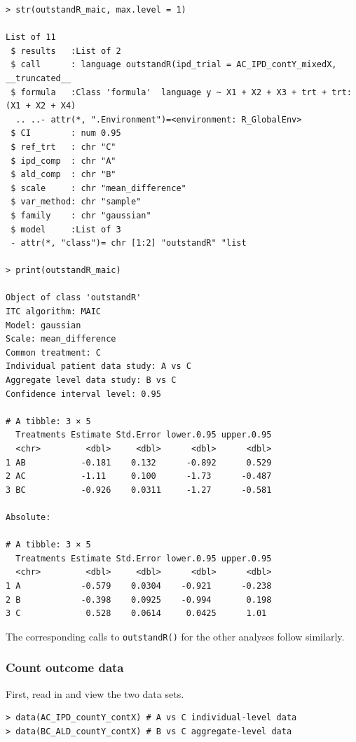 \documentclass[article]{jss}
\begin{document}
\begin{verbatim}
> str(outstandR_maic, max.level = 1)

List of 11
 $ results   :List of 2
 $ call      : language outstandR(ipd_trial = AC_IPD_contY_mixedX, __truncated__
 $ formula   :Class 'formula'  language y ~ X1 + X2 + X3 + trt + trt:(X1 + X2 + X4)
  .. ..- attr(*, ".Environment")=<environment: R_GlobalEnv> 
 $ CI        : num 0.95
 $ ref_trt   : chr "C"
 $ ipd_comp  : chr "A"
 $ ald_comp  : chr "B"
 $ scale     : chr "mean_difference"
 $ var_method: chr "sample"
 $ family    : chr "gaussian"
 $ model     :List of 3
 - attr(*, "class")= chr [1:2] "outstandR" "list

> print(outstandR_maic)

Object of class 'outstandR' 
ITC algorithm: MAIC 
Model: gaussian 
Scale: mean_difference 
Common treatment: C 
Individual patient data study: A vs C 
Aggregate level data study: B vs C 
Confidence interval level: 0.95 

# A tibble: 3 × 5
  Treatments Estimate Std.Error lower.0.95 upper.0.95
  <chr>         <dbl>     <dbl>      <dbl>      <dbl>
1 AB           -0.181    0.132      -0.892      0.529
2 AC           -1.11     0.100      -1.73      -0.487
3 BC           -0.926    0.0311     -1.27      -0.581

Absolute:

# A tibble: 3 × 5
  Treatments Estimate Std.Error lower.0.95 upper.0.95
  <chr>         <dbl>     <dbl>      <dbl>      <dbl>
1 A            -0.579    0.0304    -0.921      -0.238
2 B            -0.398    0.0925    -0.994       0.198
3 C             0.528    0.0614     0.0425      1.01 
\end{verbatim}

The corresponding calls to \texttt{outstandR()} for the other analyses follow similarly.

% 
\subsubsection{Count outcome data}
First, read in and view the two data sets.

\begin{verbatim}
> data(AC_IPD_countY_contX) # A vs C individual-level data
> data(BC_ALD_countY_contX) # B vs C aggregate-level data
\end{verbatim}



\end{document}
